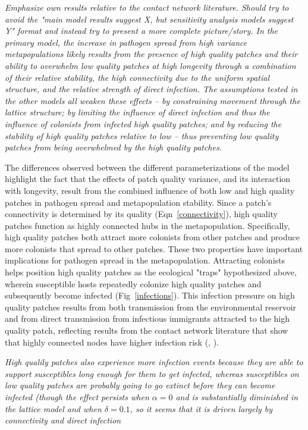 \documentclass{svjour3}
\begin{document}
\emph{Emphasize own results relative to the contact network literature.  Should try to avoid the "main model results suggest X, but sensitivity analysis models suggest Y" format and instead try to present a more complete picture/story.  In the primary model, the increase in pathogen spread from high variance metapopulations likely results from the presence of high quality patches and their ability to overwhelm low quality patches at high longevity through a combination of their relative stability, the high connectivity due to the uniform spatial structure, and the relative strength of direct infection.  The assumptions tested in the other models all weaken these effects -- by constraining movement through the lattice structure; by limiting the influence of direct infection and thus the influence of colonists from infected high quality patches; and by reducing the stability of high quality patches relative to low -- thus preventing low quality patches from being overwhelmed by the high quality patches.}

The differences observed between the different parameterizations of the model highlight the fact that the effects of patch quality variance, and its interaction with longevity, result from the combined influence of both low and high quality patches in pathogen spread and metapopulation stability.  Since a patch's connectivity is determined by its quality (Eqn~\ref{connectivity}), high quality patches function as highly connected hubs in the metapopulation.  Specifically, high quality patches both attract more colonists from other patches and produce more colonists that spread to other patches.  These two properties have important implications for pathogen spread in the metapopulation. Attracting colonists helps position high quality patches as the ecological "traps" hypothesized above, wherein susceptible hosts repeatedly colonize high quality patches and subsequently become infected (Fig~\ref{infections}).  This infection pressure on high quality patches results from both transmission from the environmental reservoir and from direct transmission from infectious immigrants attracted to the high quality patch, reflecting results from the contact network literature that show that highly connected nodes have higher infection risk (\cite{Christley2005}, \cite{Keeling2005}).  

\emph{High qualily patches also experience more infection events because they are able to support susceptibles long enough for them to get infected, whereas susceptibles on low quality patches are probably going to go extinct before they can become infected (though the effect persists when $\alpha = 0$ and is substantially diminished in the lattice model and when $\delta = 0.1$, so it seems that it is driven largely by connectivity and direct infection}
\end{document}
